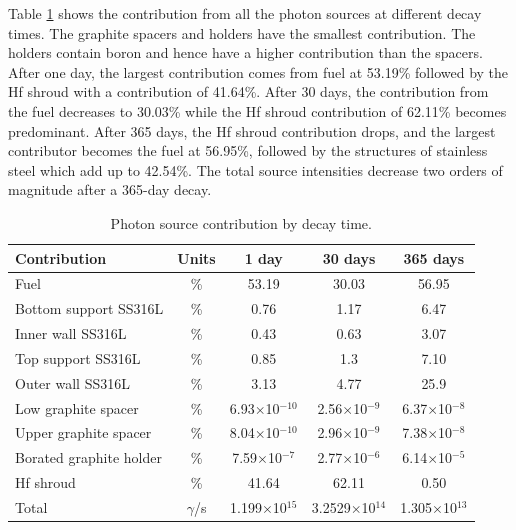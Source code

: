 Table \ref{table:agr-contr} shows the contribution from all the photon sources at different decay times.
The graphite spacers and holders have the smallest contribution.
The holders contain boron and hence have a higher contribution than the spacers.
After one day, the largest contribution comes from fuel at 53.19\% followed by the Hf shroud with a contribution of 41.64\%.
After 30 days, the contribution from the fuel decreases to 30.03\% while the Hf shroud contribution of 62.11\% becomes predominant.
After 365 days, the Hf shroud contribution drops, and the largest contributor becomes the fuel at 56.95\%, followed by the structures of stainless steel which add up to 42.54\%. 
The total source intensities decrease two orders of magnitude after a 365-day decay.

\begin{table}[!htb]
  \centering
  \caption{Photon source contribution by decay time.}
  \label{table:agr-contr} 
  \begin{tabular}{lcccc}
  \toprule
  Contribution                 & Units  & 1 day        & 30 days        & 365 days      \\
  \midrule
  Fuel                         & \%     & 53.19         & 30.03          & 56.95         \\
  Bottom support SS316L        & \%     & 0.76          & 1.17           & 6.47          \\
  Inner wall SS316L            & \%     & 0.43          & 0.63           & 3.07          \\
  Top support SS316L           & \%     & 0.85          & 1.3            & 7.10          \\
  Outer wall SS316L            & \%     & 3.13          & 4.77           & 25.9          \\
  Low graphite spacer          & \%     & 6.93$\times$10$^{-10}$  & 2.56$\times$10$^{-9}$  & 6.37$\times$10$^{-8}$  \\
  Upper graphite spacer        & \%     & 8.04$\times$10$^{-10}$  & 2.96$\times$10$^{-9}$  & 7.38$\times$10$^{-8}$  \\
  Borated graphite holder      & \%     & 7.59$\times$10$^{-7}$   & 2.77$\times$10$^{-6}$  & 6.14$\times$10$^{-5}$  \\
  Hf shroud                    & \%     & 41.64         & 62.11          & 0.50          \\ \hline
  Total                        & $\gamma$/s  & 1.199$\times$10$^{15}$  & 3.2529$\times$10$^{14}$  & 1.305$\times$10$^{13}$  \\
  \bottomrule
\end{tabular}
\end{table}

